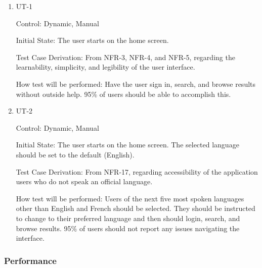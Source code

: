 \documentclass[12pt, titlepage]{article}
\begin{document}
\begin{enumerate}

\item{UT-1}

Control: Dynamic, Manual
					
Initial State: The user starts on the home screen.

Test Case Derivation: From NFR-3, NFR-4, and NFR-5, regarding the learnability, simplicity, and legibility of the user interface.

How test will be performed: Have the user sign in, search, and browse results without outside help. 95\% of users should be able to accomplish this.


\item{UT-2}

Control: Dynamic, Manual
					
Initial State: The user starts on the home screen. The selected language should be set to the default (English).

Test Case Derivation: From NFR-17, regarding accessibility of the application users who do not speak an official language.

How test will be performed: Users of the next five most spoken languages other than English and French should be selected. They should be instructed to change to their preferred language and then should login, search, and browse results. 95\% of users should not report any issues navigating the interface.


\end{enumerate}

\subsubsection{Performance}
		
\end{document}
